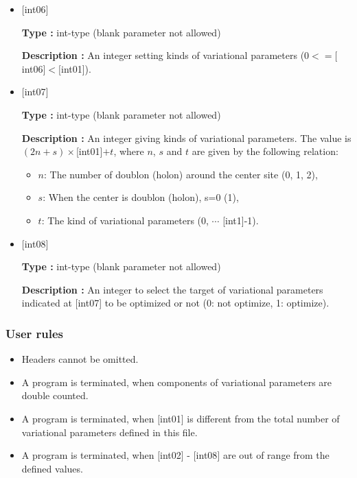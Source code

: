 \begin{itemize}
{\bf Description :} An integer giving a site index ($0<= [$int03$], [$int04$], [$int05$]<\verb|Nsite|$).
 
 \item  $[$int06$]$
   
   {\bf Type :} int-type (blank parameter not allowed)

  {\bf Description :} An integer setting kinds of variational  parameters ($0<= [$int06$]<[$int01]). 

 \item  $[$int07$]$
   
   {\bf Type :} int-type (blank parameter not allowed)

  {\bf Description :} An integer giving kinds of variational  parameters. The value is $(2n+s)\times$[int01]$+t$, where $n$, $s$ and $t$ are given by the following relation:
  \begin{itemize}
  \item{$n$}: The number of doublon (holon) around the center site (0, 1, 2),  \\
  \item{$s$}: When the center is doublon (holon), s=0 (1), \\
  \item{$t$}: The kind of variational parameters (0, $\cdots$ [int1]-1).
  \end{itemize}  
  
 \item  $[$int08$]$
   
   {\bf Type :} int-type (blank parameter not allowed)

  {\bf Description :} An integer to select the target of variational parameters indicated at [int07] to be optimized or not (0: not optimize, 1: optimize).
  
  
\end{itemize}

\subsubsection{User rules}
\begin{itemize}
\item Headers cannot be omitted. 
\item A program is terminated, when components of variational parameters are double counted.
\item A program is terminated, when $[$int01$]$ is different from the total number of variational parameters defined in this file.
\item A program is terminated, when $[$int02$]$ - $[$int08$]$ are out of range from the defined values.
\end{itemize}


